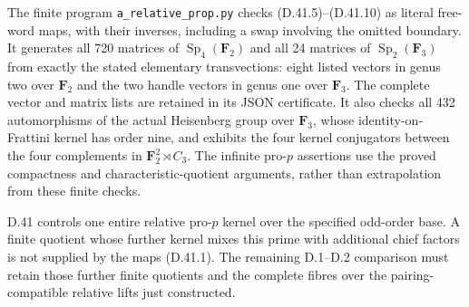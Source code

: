 The finite program
\texttt{a\_relative\_prop.py}
checks \textup{(D.41.5)--(D.41.10)}
as literal free-word maps, with
their inverses, including a swap
involving the omitted boundary.
It generates all 720 matrices
of \(\operatorname{Sp}_4(\mathbf F_2)\)
and all 24 matrices of
\(\operatorname{Sp}_2(\mathbf F_3)\)
from exactly the stated elementary
transvections: eight listed vectors in
genus two over \(\mathbf F_2\) and the
two handle vectors in genus one over
\(\mathbf F_3\).  The complete vector
and matrix lists are retained in its JSON
certificate.
It also checks all 432
automorphisms of the actual
Heisenberg group over \(\mathbf F_3\),
whose identity-on-Frattini kernel
has order nine, and exhibits the
four kernel conjugators between
the four complements in
\(\mathbf F_2^2\rtimes C_3\).
The infinite pro-\(p\) assertions
use the proved compactness and
characteristic-quotient arguments,
rather than extrapolation from
these finite checks.

D.41 controls one entire relative
pro-\(p\) kernel over the specified
odd-order base.  A finite quotient
whose further kernel mixes this
prime with additional chief factors
is not supplied by the maps
\textup{(D.41.1)}.
The remaining D.1--D.2 comparison
must retain those further finite
quotients and the complete fibres
over the pairing-compatible
relative lifts just constructed.
